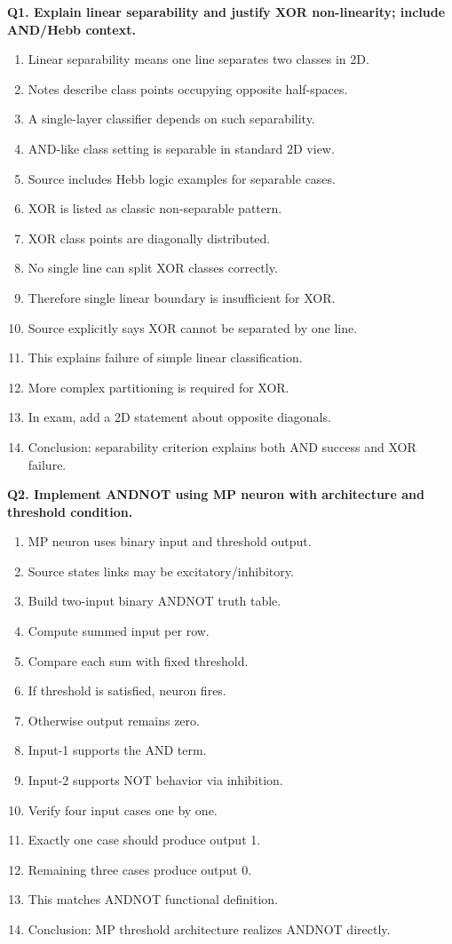 \documentclass[11pt,a4paper]{article}
\begin{document}
\textbf{Q1. Explain linear separability and justify XOR non-linearity; include AND/Hebb context.}
\begin{enumerate}
\item Linear separability means one line separates two classes in 2D.
\item Notes describe class points occupying opposite half-spaces.
\item A single-layer classifier depends on such separability.
\item AND-like class setting is separable in standard 2D view.
\item Source includes Hebb logic examples for separable cases.
\item XOR is listed as classic non-separable pattern.
\item XOR class points are diagonally distributed.
\item No single line can split XOR classes correctly.
\item Therefore single linear boundary is insufficient for XOR.
\item Source explicitly says XOR cannot be separated by one line.
\item This explains failure of simple linear classification.
\item More complex partitioning is required for XOR.
\item In exam, add a 2D statement about opposite diagonals.
\item Conclusion: separability criterion explains both AND success and XOR failure.
\end{enumerate}

\textbf{Q2. Implement ANDNOT using MP neuron with architecture and threshold condition.}
\begin{enumerate}
\item MP neuron uses binary input and threshold output.
\item Source states links may be excitatory/inhibitory.
\item Build two-input binary ANDNOT truth table.
\item Compute summed input per row.
\item Compare each sum with fixed threshold.
\item If threshold is satisfied, neuron fires.
\item Otherwise output remains zero.
\item Input-1 supports the AND term.
\item Input-2 supports NOT behavior via inhibition.
\item Verify four input cases one by one.
\item Exactly one case should produce output 1.
\item Remaining three cases produce output 0.
\item This matches ANDNOT functional definition.
\item Conclusion: MP threshold architecture realizes ANDNOT directly.
\end{enumerate}
\end{document}

